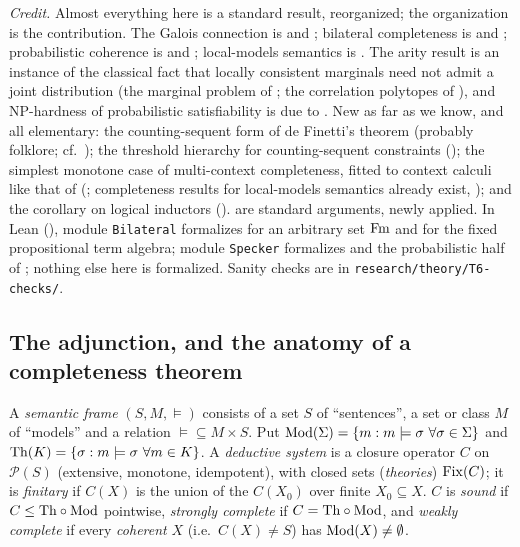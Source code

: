 \emph{Credit.} Almost everything here is a standard result, reorganized; the organization is the contribution. The Galois connection is \citet{birkhoff1940lattice} and \citet{ore1944galois}; bilateral completeness is \citet{scott1974completeness} and \citet{shoesmith1978multiple}; probabilistic coherence is \citet{definetti1937prevision} and \citet{gaifman1964concerning}; local-models semantics is \citet{ghidini2001local}. The arity result  is an instance of the classical fact that locally consistent marginals need not admit a joint distribution (the marginal problem of \citealt{vorobev1962consistent}; the correlation polytopes of \citealt{pitowsky1991correlation}), and NP-hardness of probabilistic satisfiability is due to \citet{georgakopoulos1988probabilistic}. New as far as we know, and all elementary: the counting-sequent form of de Finetti's theorem (probably folklore; cf.\ \citealt{paris1994uncertain}); the threshold hierarchy for counting-sequent constraints (); the simplest monotone case of multi-context completeness, fitted to context calculi like that of  (; completeness results for local-models semantics already exist, \citealt{ghidini2001local,serafini2004comparing}); and the corollary on logical inductors ().  are standard arguments, newly applied. In Lean (), module \texttt{Bilateral} formalizes  for an arbitrary set $\mathrm{Fm}$ and  for the fixed propositional term algebra; module \texttt{Specker} formalizes  and the probabilistic half of ; nothing else here is formalized. Sanity checks are in \texttt{research/theory/T6-checks/}.

\subsection{The adjunction, and the anatomy of a completeness theorem}\label{sec:existence:galois}

\begin{definition}\label{def:existence:frame}
A \emph{semantic frame} $(S,M,\models)$ consists of a set $S$ of ``sentences'', a set or class $M$ of ``models'' and a relation ${\models}\subseteq M\times S$. Put $\Mod(\Sigma)=\{m:m\models\sigma\ \forall\sigma\in\Sigma\}$ and $\mathrm{Th}(K)=\{\sigma:m\models\sigma\ \forall m\in K\}$. A \emph{deductive system} is a closure operator $C$ on $\mathcal P(S)$ (extensive, monotone, idempotent), with closed sets (\emph{theories}) $\mathrm{Fix}(C)$; it is \emph{finitary} if $C(X)$ is the union of the $C(X_0)$ over finite $X_0\subseteq X$. $C$ is \emph{sound} if $C\le\mathrm{Th}\circ\mathrm{Mod}$ pointwise, \emph{strongly complete} if $C=\mathrm{Th}\circ\mathrm{Mod}$, and \emph{weakly complete} if every \emph{coherent} $X$ (i.e.\ $C(X)\neq S$) has $\mathrm{Mod}(X)\neq\emptyset$.
\end{definition}

